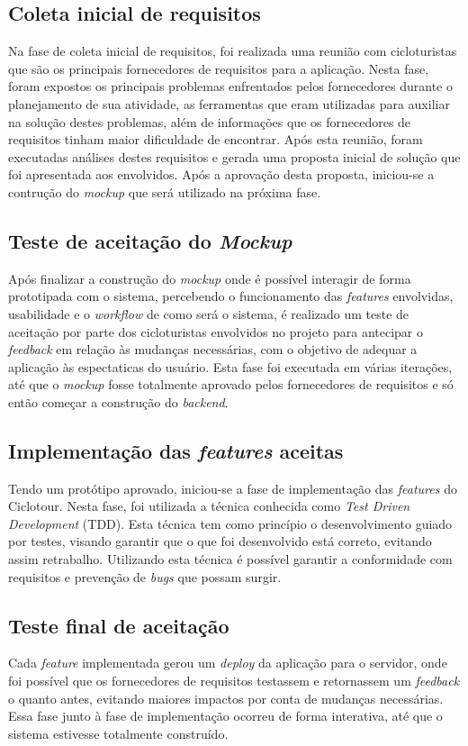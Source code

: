 \subsection{Coleta inicial de requisitos}
Na fase de coleta inicial de requisitos, foi realizada uma reunião com cicloturistas que são os principais fornecedores de requisitos para a 
aplicação. Nesta fase, foram expostos os principais problemas enfrentados pelos fornecedores durante o planejamento de sua atividade, as 
ferramentas que eram utilizadas para auxiliar na solução destes problemas, além de informações que os fornecedores de requisitos tinham maior
dificuldade de encontrar. Após esta reunião, foram executadas análises destes requisitos e gerada uma proposta inicial de solução que foi apresentada
aos envolvidos. Após a aprovação desta proposta, iniciou-se a contrução do \textit{mockup} que será utilizado na próxima fase.

\subsection{Teste de aceitação do \textit{Mockup}}
Após finalizar a construção do \textit{mockup} onde é possível interagir de forma prototipada com o sistema, percebendo o funcionamento das 
\textit{features} envolvidas, usabilidade e o \textit{workflow} de como será o sistema, é realizado um teste de aceitação por parte dos 
cicloturistas envolvidos no projeto para antecipar o \textit{feedback} em relação às mudanças necessárias, com o objetivo de adequar a aplicação às 
espectaticas do usuário. Esta fase foi executada em várias iterações, até que o \textit{mockup} fosse totalmente aprovado pelos fornecedores de 
requisitos e só então começar a construção do \textit{backend}.

\subsection{Implementação das \textit{features} aceitas}
Tendo um protótipo aprovado, iniciou-se a fase de implementação das \textit{features} do Ciclotour. Nesta fase, foi utilizada a técnica conhecida 
como \textit{Test Driven Development} (TDD). Esta técnica tem como princípio o desenvolvimento guiado por testes, visando garantir que o que foi 
desenvolvido está correto, evitando assim retrabalho. Utilizando esta técnica é possível garantir a conformidade com requisitos e prevenção de 
\textit{bugs} que possam surgir. 

\subsection{Teste final de aceitação}
Cada \textit{feature} implementada gerou um \textit{deploy} da aplicação para o servidor, onde foi possível que os fornecedores de requisitos testassem
e retornassem um \textit{feedback} o quanto antes, evitando maiores impactos por conta de mudanças necessárias. Essa fase junto à fase de 
implementação ocorreu de forma interativa, até que o sistema estivesse totalmente construído.


